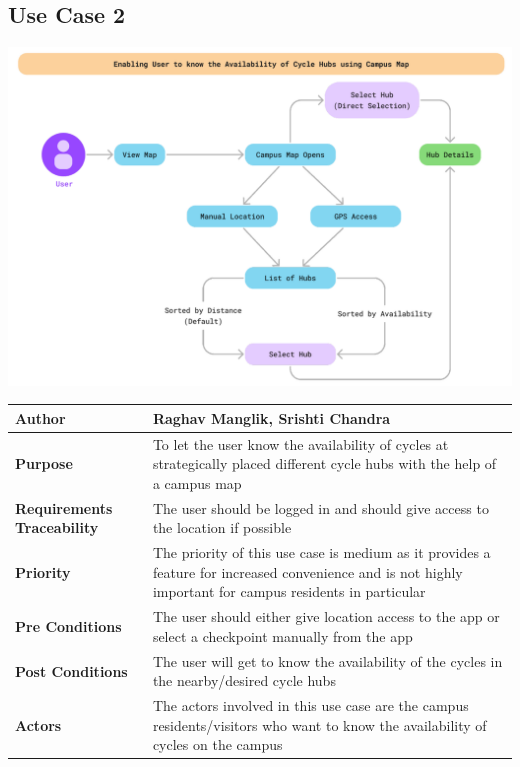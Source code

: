 \documentclass{scrreprt}
\begin{document}
\subsection{Use Case 2}
\begin{center}
\includegraphics*[scale=0.6]{usecase-2.png}\\
\vspace{5mm}
\begin{tabular}{|l|p{10cm}|}
    \hline
    \textbf{Author} & Raghav Manglik, Srishti Chandra \\
    \hline
    \textbf{Purpose} & To let the user know the availability of cycles at strategically placed different cycle hubs with the help of a campus map \\
    \hline
    \textbf{Requirements Traceability} & The user should be logged in and should give access to  the location if possible\\
    \hline
    \textbf{Priority} & The priority of this use case is medium as it provides a feature for increased convenience and is not highly important for campus residents in particular\\
    \hline
    \textbf{Pre Conditions} &The user should either give location access to the app or select a checkpoint manually from the app \\
    \hline
    \textbf{Post Conditions} & The user will get to know the availability of the cycles in the   nearby/desired cycle hubs\\
    \hline
    \textbf{Actors} & The actors involved in this use case are the campus residents/visitors who want to know the availability of cycles on the campus\\
    \hline
\end{tabular}
\end{center}
\end{document}
